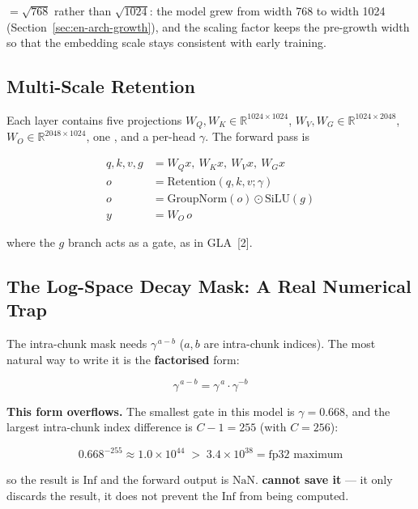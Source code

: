 \begin{notebox}
 $= \sqrt{768}$ rather than $\sqrt{1024}$: the model grew from width
768 to width 1024 (Section~\ref{sec:en-arch-growth}), and the scaling factor keeps the
pre-growth width so that the embedding scale stays consistent with early training.
\end{notebox}

\subsection{Multi-Scale Retention}
\label{sec:en-arch-msr}

Each  layer contains five projections
$W_Q, W_K \in \mathbb{R}^{1024 \times 1024}$,
$W_V, W_G \in \mathbb{R}^{1024 \times 2048}$,
$W_O \in \mathbb{R}^{2048 \times 1024}$, one , and a per-head $\gamma$.
The forward pass is

\[
\begin{aligned}
q, k, v, g &= W_Q x,\ W_K x,\ W_V x,\ W_G x \\
o &= \text{Retention}(q, k, v; \gamma) \\
o &= \text{GroupNorm}(o) \odot \text{SiLU}(g) \\
y &= W_O\, o
\end{aligned}
\]

where the $g$ branch acts as a gate, as in GLA~[2].

\subsection{The Log-Space Decay Mask: A Real Numerical Trap}
\label{sec:en-arch-mask}

The intra-chunk mask needs $\gamma^{\,a-b}$ ($a, b$ are intra-chunk indices). The most
natural way to write it is the \textbf{factorised} form:

\[
\gamma^{\,a-b} = \gamma^{\,a} \cdot \gamma^{-b}
\]

\textbf{This form overflows.} The smallest gate in this model is $\gamma = 0.668$, and
the largest intra-chunk index difference is $C-1 = 255$ (with $C = 256$):

\[
0.668^{-255} \approx 1.0 \times 10^{44} \;>\; 3.4 \times 10^{38} = \text{fp32 maximum}
\]

so the result is $\text{Inf}$ and the forward output is $\text{NaN}$.
\textbf{ cannot save it} --- it only discards the result, it does not
prevent the $\text{Inf}$ from being computed.

